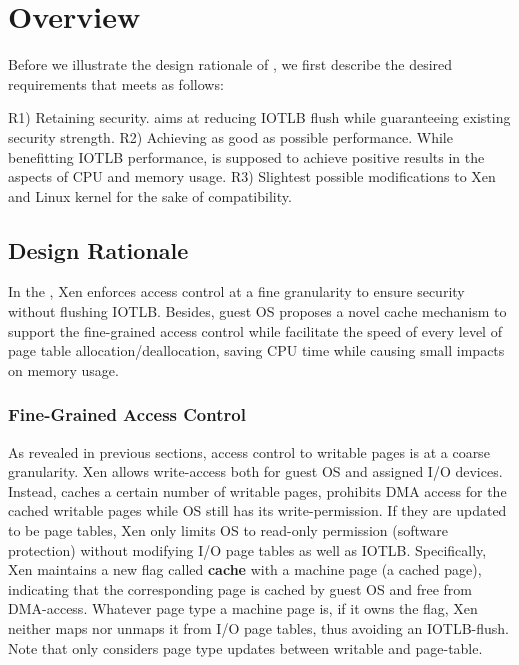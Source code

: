 \section{\name Overview} \label{sec:overview}
Before we illustrate the design rationale of \name, we first describe the desired requirements that \name meets as follows:

R1) Retaining security. \name aims at reducing IOTLB flush while guaranteeing existing security strength.
R2) Achieving as good as possible performance. While benefitting IOTLB performance, \name is supposed to achieve positive results in the aspects of CPU and memory usage.
R3) Slightest possible modifications to Xen and Linux kernel for the sake of compatibility.

\subsection{Design Rationale}
In the \name, Xen enforces access control at a fine granularity to ensure security without flushing IOTLB. Besides, guest OS proposes a novel cache mechanism to support the fine-grained access control while facilitate the speed of every level of page table allocation/deallocation, saving CPU time while causing small impacts on memory usage.

\subsubsection{Fine-Grained Access Control}
As revealed in previous sections, access control to writable pages is at a coarse granularity. Xen allows write-access both for guest OS and assigned I/O devices. Instead, \name caches a certain number of writable pages, prohibits DMA access for the cached writable pages while OS still has its write-permission. If they are updated to be page tables, Xen only limits OS to read-only permission (software protection) without modifying I/O page tables as well as IOTLB. Specifically, Xen maintains a new flag called \textbf{cache} with a machine page (a cached page), indicating that the corresponding page is cached by guest OS and free from DMA-access. Whatever page type a machine page is, if it owns the flag, Xen neither maps nor unmaps it from I/O page tables, thus avoiding an IOTLB-flush. Note that \name only considers page type updates between writable and page-table.


